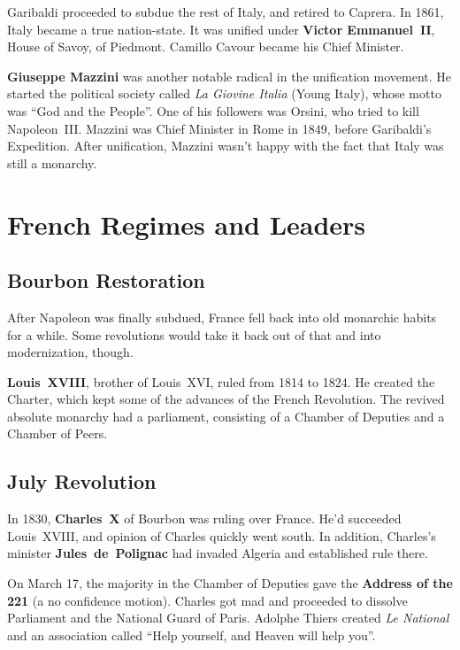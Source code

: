 Garibaldi proceeded to subdue the rest of Italy, and retired to Caprera.
In 1861, Italy became a true nation-state.
It was unified under \textbf{Victor Emmanuel~II}, House of Savoy, of Piedmont.
Camillo Cavour became his Chief Minister.

\textbf{Giuseppe Mazzini} was another notable radical in the unification movement.
He started the political society called \textit{La Giovine Italia} (Young Italy),
whose motto was ``God and the People''.
One of his followers was Orsini, who tried to kill Napoleon~III\@.
Mazzini was Chief Minister in Rome in 1849, before Garibaldi's Expedition.
After unification, Mazzini wasn't happy with the fact that Italy was still a monarchy.

\section{French Regimes and Leaders}

\subsection*{Bourbon Restoration}

After Napoleon was finally subdued, France fell back into old monarchic habits for a while.
Some revolutions would take it back out of that and into modernization, though.

\textbf{Louis~XVIII}, brother of Louis~XVI, ruled from 1814 to 1824.
He created the Charter, which kept some of the advances of the French Revolution.
The revived absolute monarchy had a parliament, consisting of a Chamber of Deputies and a Chamber of Peers.

\subsection*{July Revolution}

In 1830, \textbf{Charles~X} of Bourbon was ruling over France.
He'd succeeded Louis~XVIII, and opinion of Charles quickly went south.
In addition,
Charles's minister \textbf{Jules~de~Polignac} had invaded Algeria and established rule there.

On March 17,
the majority in the Chamber of Deputies gave the \textbf{Address of the 221} (a no confidence motion).
Charles got mad and proceeded to dissolve Parliament and the National Guard of Paris.
Adolphe Thiers created \textit{Le National} and an association called ``Help yourself, and Heaven will help you''.

